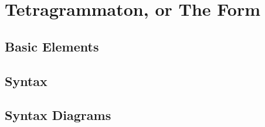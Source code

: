 \chapter{Tetragrammaton, or The Form}\label{ch:TFE}

%


\section{Basic Elements}\label{sec:ch1_BE}

\section{Syntax}\label{sec:ch1_Syn}

\section{Syntax Diagrams}\label{sec:ch1_SD}
